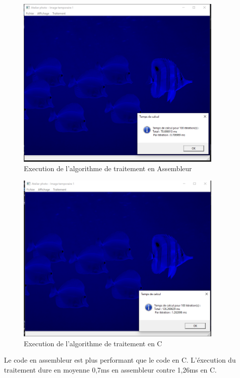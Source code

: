 \documentclass[11pt]{report}
\begin{document}
\begin{figure}[ht]
\includegraphics[width=10cm]{Capture1.PNG}
\caption{Execution de l'algorithme de traitement en Assembleur}
\end{figure}

\begin{figure}[ht]
\includegraphics[width=10cm]{Capture2.PNG}
\caption{Execution de l'algorithme de traitement en C}
\end{figure}

Le code en assembleur est plus performant que le code en C.
L'éxecution du traitement dure en moyenne 0,7ms en assembleur contre 1,26ms en C.
\end{document}
